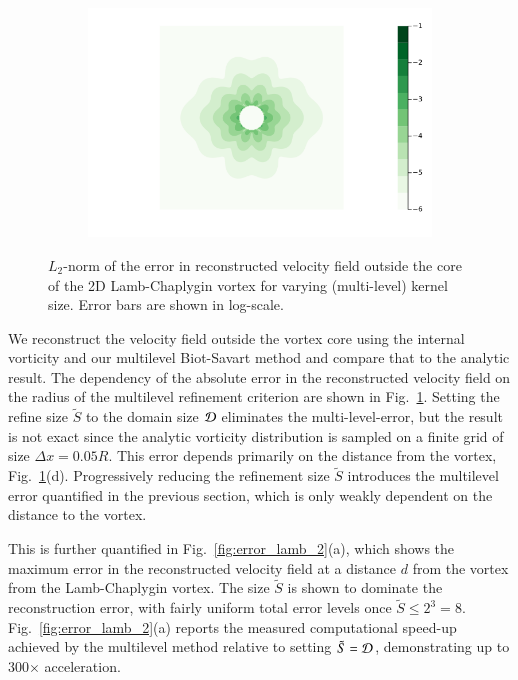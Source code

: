\documentclass[preprint,12pt]{elsarticle}
\begin{document}
\begin{figure}
\begin{subfigure}{.5\textwidth}
  \caption{}
\end{subfigure}%
\begin{subfigure}{.5\textwidth}
  \centering
  \includegraphics[width=\linewidth]{tex/fig/lamb_dipole_error_dist128.png}
  \caption{}
\end{subfigure}
\caption{$L_2$-norm of the error in reconstructed velocity field outside the core of the 2D Lamb-Chaplygin vortex for varying (multi-level) kernel size. Error bars are shown in log-scale.}
\label{fig:lam_error_dist}
\end{figure}

We reconstruct the velocity field outside the vortex core using the internal vorticity and our multilevel Biot-Savart method and compare that to the analytic result. The dependency of the absolute error in the reconstructed velocity field on the radius of the multilevel refinement criterion are shown in Fig.~\ref{fig:lam_error_dist}. Setting the refine size $\tilde{S}$ to the domain size $\cal D$ eliminates the multi-level-error, but the result is not exact since the analytic vorticity distribution is sampled on a finite grid of size $\Delta x=0.05
R$. This error depends primarily on the distance from the vortex, Fig.~\ref{fig:lam_error_dist}(d). Progressively reducing the refinement size $\tilde{S}$ introduces the multilevel error quantified in the previous section, which is only weakly dependent on the distance to the vortex.

This is further quantified in Fig.~\ref{fig:error_lamb_2}(a), which shows the maximum error in the reconstructed velocity field at a distance $d$ from the vortex from the Lamb-Chaplygin vortex. The size $\tilde{S}$ is shown to dominate the reconstruction error, with fairly uniform total error levels once $\tilde{S} \le 2^3 = 8$. Fig.~\ref{fig:error_lamb_2}(a) reports the measured computational speed-up achieved by the multilevel method relative to setting $\tilde{S}=\cal D$, demonstrating up to 300$\times$ acceleration.
\end{document}
